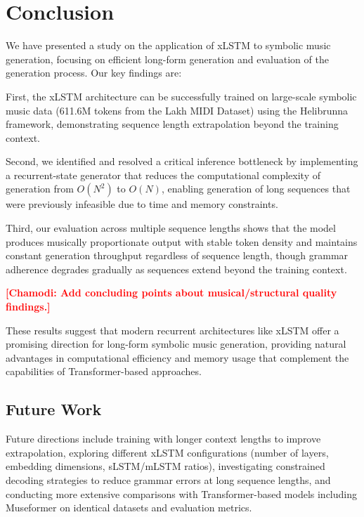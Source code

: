 \documentclass[conference]{IEEEtran}
\newcommand{\placeholder}[1]{\textcolor{red}{\textbf{[#1]}}}
\begin{document}
\section{Conclusion}
\label{sec:conclusion}

We have presented a study on the application of xLSTM to symbolic music generation, focusing on efficient long-form generation and evaluation of the generation process. Our key findings are:

First, the xLSTM architecture can be successfully trained on large-scale symbolic music data (611.6M tokens from the Lakh MIDI Dataset) using the Helibrunna framework, demonstrating sequence length extrapolation beyond the training context.

Second, we identified and resolved a critical inference bottleneck by implementing a recurrent-state generator that reduces the computational complexity of generation from $O(N^2)$ to $O(N)$, enabling generation of long sequences that were previously infeasible due to time and memory constraints.

Third, our evaluation across multiple sequence lengths shows that the model produces musically proportionate output with stable token density and maintains constant generation throughput regardless of sequence length, though grammar adherence degrades gradually as sequences extend beyond the training context.

\placeholder{Chamodi: Add concluding points about musical/structural quality findings.}

These results suggest that modern recurrent architectures like xLSTM offer a promising direction for long-form symbolic music generation, providing natural advantages in computational efficiency and memory usage that complement the capabilities of Transformer-based approaches.

\subsection{Future Work}

Future directions include training with longer context lengths to improve extrapolation, exploring different xLSTM configurations (number of layers, embedding dimensions, sLSTM/mLSTM ratios), investigating constrained decoding strategies to reduce grammar errors at long sequence lengths, and conducting more extensive comparisons with Transformer-based models including Museformer on identical datasets and evaluation metrics.
\end{document}
